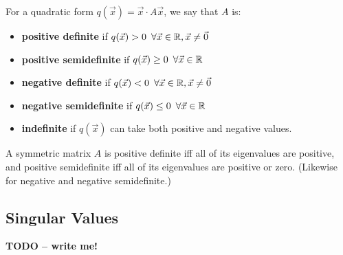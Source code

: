 \documentclass[]{scrartcl}
\begin{document}
	For a quadratic form $q(\vec{x}) = \vec{x} \cdot A\vec{x}$, we say that $A$ is:
	\begin{itemize}
		\item \textbf{positive definite} if $q(\vec{x}) > 0 \enskip \forall \vec{x} \in \mathbb{R}, \vec{x} \neq \vec{0}$
		\item \textbf{positive semidefinite} if $q(\vec{x}) \geq 0 \enskip \forall \vec{x} \in \mathbb{R}$
		\item \textbf{negative definite} if $q(\vec{x}) < 0 \enskip \forall \vec{x} \in \mathbb{R}, \vec{x} \neq \vec{0}$
		\item \textbf{negative semidefinite} if $q(\vec{x}) \leq 0 \enskip \forall \vec{x} \in \mathbb{R}$
		\item \textbf{indefinite} if $q(\vec{x})$ can take both positive and negative values.
	\end{itemize}

	A symmetric matrix $A$ is positive definite iff all of its eigenvalues are positive, and positive semidefinite iff all of its eigenvalues are positive or zero. (Likewise for negative and negative semidefinite.) \\
	
	
	
	\subsection{Singular Values}
	\textbf{TODO -- write me!}
	
\end{document}
